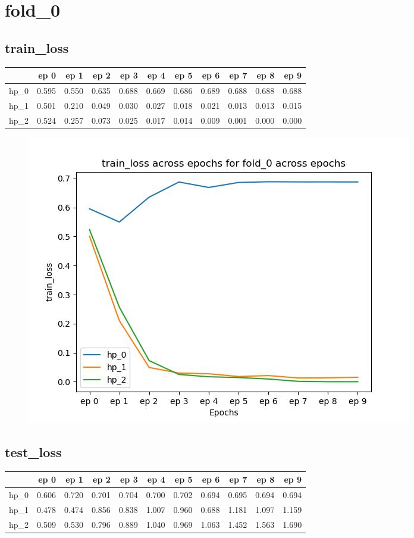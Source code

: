 \documentclass{article}
\begin{document}
\section{fold\_0}
\subsection{train\_loss}
\begin{tabular}{lrrrrrrrrrr}
\toprule
{} &   ep 0 &   ep 1 &   ep 2 &   ep 3 &   ep 4 &   ep 5 &   ep 6 &   ep 7 &   ep 8 &   ep 9 \\
\midrule
hp\_0 &  0.595 &  0.550 &  0.635 &  0.688 &  0.669 &  0.686 &  0.689 &  0.688 &  0.688 &  0.688 \\
hp\_1 &  0.501 &  0.210 &  0.049 &  0.030 &  0.027 &  0.018 &  0.021 &  0.013 &  0.013 &  0.015 \\
hp\_2 &  0.524 &  0.257 &  0.073 &  0.025 &  0.017 &  0.014 &  0.009 &  0.001 &  0.000 &  0.000 \\
\bottomrule
\end{tabular}

\begin{figure}[H]
\includegraphics[scale = 0.75]{fold_0/train_loss}
\end{figure}
\subsection{test\_loss}
\begin{tabular}{lrrrrrrrrrr}
\toprule
{} &   ep 0 &   ep 1 &   ep 2 &   ep 3 &   ep 4 &   ep 5 &   ep 6 &   ep 7 &   ep 8 &   ep 9 \\
\midrule
hp\_0 &  0.606 &  0.720 &  0.701 &  0.704 &  0.700 &  0.702 &  0.694 &  0.695 &  0.694 &  0.694 \\
hp\_1 &  0.478 &  0.474 &  0.856 &  0.838 &  1.007 &  0.960 &  0.688 &  1.181 &  1.097 &  1.159 \\
hp\_2 &  0.509 &  0.530 &  0.796 &  0.889 &  1.040 &  0.969 &  1.063 &  1.452 &  1.563 &  1.690 \\
\bottomrule
\end{tabular}
\end{document}
